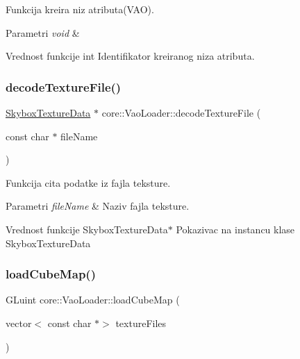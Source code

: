 Funkcija kreira niz atributa(\+V\+A\+O). 


\begin{DoxyParams}{Parametri}
{\em void} & \\
\hline
\end{DoxyParams}
\begin{DoxyReturn}{Vrednost funkcije}
int Identifikator kreiranog niza atributa. 
\end{DoxyReturn}
\mbox{\label{classcore_1_1VaoLoader_a8310742834449c159828f87e771a5258}} 
\subsubsection{\texorpdfstring{decode\+Texture\+File()}{decodeTextureFile()}}
{\footnotesize\ttfamily \hyperlink{classtexture_1_1SkyboxTextureData}{Skybox\+Texture\+Data} $\ast$ core\+::\+Vao\+Loader\+::decode\+Texture\+File (\begin{DoxyParamCaption}\item[{const char $\ast$}]{file\+Name }\end{DoxyParamCaption})\hspace{0.3cm}{\ttfamily [private]}}



Funkcija cita podatke iz fajla teksture. 


\begin{DoxyParams}{Parametri}
{\em file\+Name} & Naziv fajla teksture. \\
\hline
\end{DoxyParams}
\begin{DoxyReturn}{Vrednost funkcije}
Skybox\+Texture\+Data$\ast$ Pokazivac na instancu klase Skybox\+Texture\+Data 
\end{DoxyReturn}
\mbox{\label{classcore_1_1VaoLoader_a98165161bee2940808fe5e546dfa25d9}} 
\subsubsection{\texorpdfstring{load\+Cube\+Map()}{loadCubeMap()}}
{\footnotesize\ttfamily G\+Luint core\+::\+Vao\+Loader\+::load\+Cube\+Map (\begin{DoxyParamCaption}\item[{vector$<$ const char $\ast$$>$}]{texture\+Files }\end{DoxyParamCaption})}



